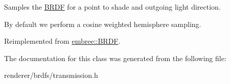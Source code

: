 Samples the \hyperlink{classembree_1_1_b_r_d_f}{BRDF} for a point to shade and outgoing light direction. 

By default we perform a cosine weighted hemisphere sampling. 

Reimplemented from \hyperlink{classembree_1_1_b_r_d_f_a6eb1a114a4f36dc2c1ad65bcbce5f809}{embree::BRDF}.



The documentation for this class was generated from the following file:\begin{DoxyCompactItemize}
\item 
renderer/brdfs/transmission.h\end{DoxyCompactItemize}
